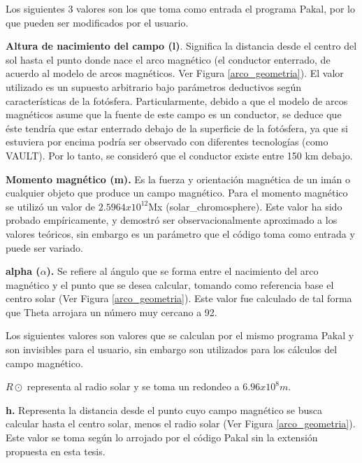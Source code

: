 \documentclass[9pt]{book}
\begin{document}
Los siguientes 3 valores son los que toma como entrada el programa Pakal, por lo que pueden ser modificados por el usuario.

\textbf{Altura de nacimiento del campo (l)}. Significa la distancia desde el centro del sol hasta el punto donde nace el arco magn\'etico (el conductor enterrado, de acuerdo al modelo de arcos magn\'eticos. Ver Figura \ref{arco_geometria}). El valor utilizado es un supuesto arbitrario bajo par\'ametros deductivos seg\'un caracter\'isticas de la fot\'osfera. Particularmente, debido a que el modelo de arcos magn\'eticos asume que la fuente de este campo es un conductor, se deduce que \'este tendr\'ia que estar enterrado debajo de la superficie de la fot\'osfera, ya que si estuviera por encima podr\'ia ser observado con diferentes tecnolog\'ias (como VAULT). Por lo tanto, se consider\'o que el conductor existe entre 150 km debajo.

\textbf{Momento magn\'etico (m).} Es la fuerza y orientaci\'on magn\'etica de un im\'an o cualquier objeto que produce un campo magn\'etico. Para el momento magn\'etico se utiliz\'o un valor de $2.5964x10^{12}$Mx (solar\_chromosphere). Este valor ha sido probado emp\'iricamente, y demostr\'o ser observacionalmente aproximado a los valores te\'oricos, sin embargo es un par\'ametro que el c\'odigo toma como entrada y puede ser variado.

\textbf{alpha ($\alpha$).} Se refiere al \'angulo que se forma entre el nacimiento del arco magn\'etico y el punto que se desea calcular, tomando como referencia base el centro solar (Ver Figura \ref{arco_geometria}). Este valor fue calculado de tal forma que Theta arrojara un n\'umero muy cercano a 92\degree.

Los siguientes valores son valores que se calculan por el mismo programa Pakal y son invisibles para el usuario, sin embargo son utilizados para los c\'alculos del campo magn\'etico.


\textbf{\(R\odot\)}  representa al radio solar y se toma un redondeo a $6.96x10^8m$.

\textbf{h.} Representa la distancia desde el punto cuyo campo magn\'etico se busca calcular hasta el centro solar, menos el radio solar (Ver Figura \ref{arco_geometria}). Este valor se toma seg\'un lo arrojado por el c\'odigo Pakal sin la extensi\'on propuesta en esta tesis.
\end{document}
